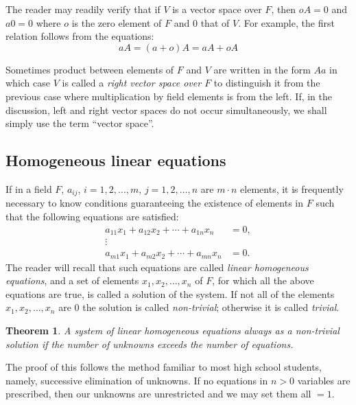\documentclass[11pt]{article}
\newtheorem{theo}{Theorem}
\theoremstyle{definition}
\begin{document}
The reader may readily verify that if $V$ is a vector space over $F$, then $oA = 0$ and $a0 = 0$ where $o$ is the zero element of $F$ and $0$ that of $V$.
For example, the first relation follows from the equations:
\[
aA = (a + o)A = aA + oA
\]

Sometimes product between elements of $F$ and $V$ are written in the form $Aa$ in which case $V$ is called a \emph{right vector space over $F$} to distinguish it from the previous case where multiplication by field elements is from the left.
If, in the discussion, left and right vector spaces do not occur simultaneously, we shall simply use the term ``vector space''.


\subsection{Homogeneous linear equations}

If in a field $F$, $a_{ij}$, $i = 1,2,\ldots,m$, $j = 1,2,\ldots,n$ are $m \cdot n$ elements, it is frequently necessary to know conditions guaranteeing the existence of elements in $F$ such that the following equations are satisfied:
\begin{equation}
\label{eq:on}
\begin{aligned}
a_{11} x_1 + a_{12} x_2 + \cdots + a_{1n} x_n &= 0,
\\
\vdots &
\\
a_{m1} x_1 + a_{m2} x_2 + \cdots + a_{mn} x_n &= 0.
\end{aligned}
\end{equation}
The reader will recall that such equations are called \emph{linear homogeneous equations}, and a set of elements $x_1, x_2, \ldots, x_n$ of $F$, for which all the above equations are true, is called a solution of the system.
If not all of the elements $x_1, x_2, \ldots, x_n$ are $0$ the solution is called \emph{non-trivial}; otherwise it is called \emph{trivial}.


\begin{theo}
\label{theo:on}
A system of linear homogeneous equations always as a non-trivial solution if the number of unknowns exceeds the number of equations.
\end{theo}


The proof of this follows the method familiar to most high school students, namely, successive elimination of unknowns.
If no equations in $n > 0$ variables are prescribed, then our unknowns are unrestricted and we may set them all $= 1$.
\end{document}
